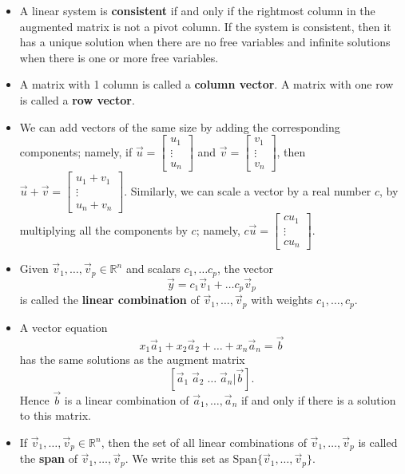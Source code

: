 \documentclass[12pt,letterpaper]{article}
\begin{document}
\begin{itemize}
\item A linear system is \textbf{consistent} if and only if the rightmost column in the augmented matrix is not a pivot column. If the system is consistent, then it has a unique solution when there are no free variables and infinite solutions when there is one or more free variables.
\item A matrix with 1 column is called a {\bf column vector}. A matrix with one row is called a {\bf row vector}.
\item We can add vectors of the same size by adding the corresponding components; namely,
if $\vec{u}=\begin{bmatrix} u_1\\ \vdots\\ u_n \end{bmatrix}$ and  $\vec{v}=\begin{bmatrix} v_1\\ \vdots\\ v_n \end{bmatrix}$, then $\vec{u}+\vec{v} =\begin{bmatrix} u_1+v_1\\ \vdots\\ u_n+v_n \end{bmatrix}$. Similarly, we can scale a vector by a real number $c$, by multiplying all the components by $c$; namely, $c\vec{u}=\begin{bmatrix} cu_1\\ \vdots\\ cu_n \end{bmatrix}$.
\item Given $\vec{v}_1,\dots, \vec{v}_p \in \mathbb{R}^n$ and scalars $c_1, \dots c_p$, the vector $$\vec{y} = c_1 \vec{v}_1 +\dots c_p \vec{v}_p$$ is called the {\bf linear combination} of $\vec{v}_1,\dots, \vec{v}_p$ with weights $c_1,\dots,c_p$.
\item A vector equation $$x_1 \vec{a}_1 + x_2 \vec{a}_2 +\dots + x_n \vec{a}_n =\vec{b}$$ has the same solutions as the augment matrix $$[\vec{a}_1 \; \vec{a}_2 \; \dots \; \vec{a}_n \Big| \vec{b}].$$ Hence $\vec{b}$ is a linear combination of $\vec{a}_1, \dots, \vec{a}_n$ if and only if there is a solution to this matrix.
\item If $\vec{v}_1, \dots, \vec{v}_p \in \mathbb{R}^n$, then the set of all linear combinations of $\vec{v}_1, \dots, \vec{v}_p$ is called the {\bf span} of $\vec{v}_1, \dots, \vec{v}_p$. We write this set as $\text{Span} \{\vec{v}_1, \dots, \vec{v}_p\}$.
\end{itemize}
\end{document}
